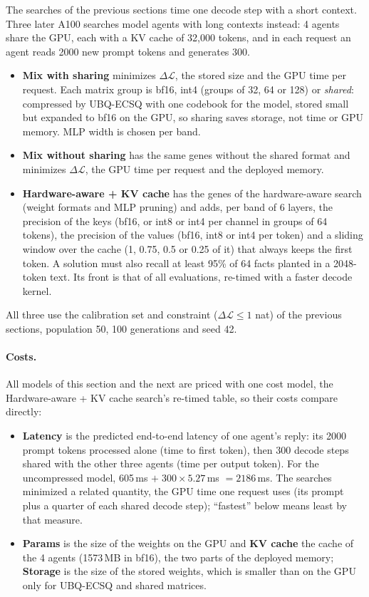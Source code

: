 \documentclass[11pt]{article}
\newcommand{\dloss}{\Delta\mathcal{L}}
\begin{document}
The searches of the previous sections time one decode step with a short context. Three later A100 searches
model agents with long contexts instead: 4 agents share the GPU, each with a KV cache of 32{,}000 tokens, and in
each request an agent reads 2000 new prompt tokens and generates 300.
\begin{itemize}
  \item \textbf{Mix with sharing} minimizes $\dloss$, the stored size and the GPU time per request. Each matrix
        group is bf16, int4 (groups of 32, 64 or 128) or \emph{shared}: compressed by UBQ-ECSQ with one codebook
        for the model, stored small but expanded to bf16 on the GPU, so sharing saves storage, not time or GPU
        memory. MLP width is chosen per band.
  \item \textbf{Mix without sharing} has the same genes without the shared format and minimizes $\dloss$, the GPU
        time per request and the deployed memory.
  \item \textbf{Hardware-aware + KV cache} has the genes of the hardware-aware search (weight formats and MLP
        pruning) and adds, per band of 6 layers, the precision of the keys (bf16, or int8 or int4 per
        channel in groups of 64 tokens), the precision of the values (bf16, int8 or int4 per token) and a
        sliding window over the cache (1, 0.75, 0.5 or 0.25 of it) that always keeps the first token. A
        solution must also recall at least 95\% of 64 facts planted in a 2048-token text. Its front is that of
        all evaluations, re-timed with a faster decode kernel.
\end{itemize}
All three use the calibration set and constraint ($\dloss\le1$ nat) of the previous sections, population
50, 100 generations and seed 42.

\paragraph{Costs.} All models of this section and the next are priced with one cost model, the Hardware-aware + KV cache search's
re-timed table, so their costs compare directly:
\begin{itemize}
  \item \textbf{Latency} is the predicted end-to-end latency of one agent's reply: its 2000 prompt tokens
        processed alone (time to first token), then 300 decode steps shared with the other three agents
        (time per output token). For the uncompressed model, 605\,ms $+\;300\times5.27$\,ms
        $=2186$\,ms. The searches minimized a related quantity, the GPU time one request uses (its
        prompt plus a quarter of each shared decode step); ``fastest'' below means least by that measure.
  \item \textbf{Params} is the size of the weights on the GPU and \textbf{KV cache} the cache of the 4 agents
        (1573\,MB in bf16), the two parts of the deployed memory; \textbf{Storage} is the size of the stored
        weights, which is smaller than on the GPU only for UBQ-ECSQ and shared matrices.
\end{itemize}
\end{document}
